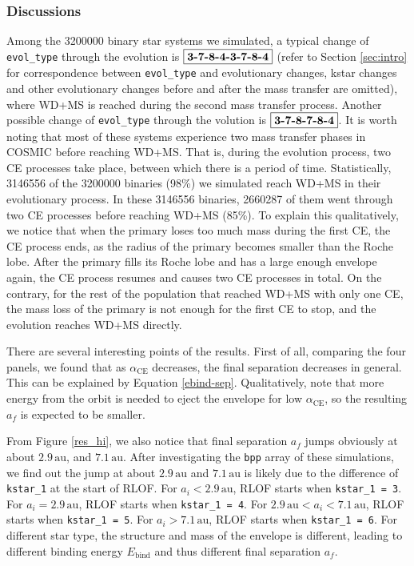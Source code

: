 \documentclass[12pt]{article}
\newcommand{\alphace}{\alpha_{\mathrm{CE}}}
\newcommand{\Ebind}{E_{\mathrm{bind}}}
\newcommand{\au}{\, \mathrm{au}}
\begin{document}
\subsubsection{Discussions}

Among the 3200000 binary star systems we simulated, a typical change of \verb|evol_type| through the evolution is $\boxed{\text{\textbf{3-7-8-4-3-7-8-4}}}$ (refer to Section \ref{sec:intro} for correspondence between \verb|evol_type| and evolutionary changes, kstar changes and other evolutionary changes before and after the mass transfer are omitted), where WD+MS is reached during the second mass transfer process. Another possible change of \verb|evol_type| through the volution is $\boxed{\text{\textbf{3-7-8-7-8-4}}}$. It is worth noting that most of these systems experience two mass transfer phases in COSMIC before reaching WD+MS. That is, during the evolution process, two CE processes take place, between which there is a period of time. Statistically, 3146556 of the 3200000 binaries (98\%) we simulated reach WD+MS in their evolutionary process. In these 3146556 binaries, 2660287 of them went through two CE processes before reaching WD+MS (85\%). To explain this qualitatively, we notice that when the primary loses too much mass during the first CE, the CE process ends, as the radius of the primary becomes smaller than the Roche lobe. After the primary fills its Roche lobe and has a large enough envelope again, the CE process resumes and causes two CE processes in total. On the contrary, for the rest of the population that reached WD+MS with only one CE, the mass loss of the primary is not enough for the first CE to stop, and the evolution reaches WD+MS directly.

There are several interesting points of the results. First of all, comparing the four panels, we found that as $\alphace$ decreases, the final separation decreases in general. This can be explained by Equation \ref{ebind-sep}. Qualitatively, note that more energy from the orbit is needed to eject the envelope for low $\alphace$, so the resulting $a_f$ is expected to be smaller. 

From Figure \ref{res_hi}, we also notice that final separation $a_f$ jumps obviously at about $2.9 \au$, and $7.1 \au$. After investigating the \verb|bpp| array of these simulations, we find out the jump at about $2.9 \au$ and $7.1 \au$ is likely due to the difference of \verb|kstar_1| at the start of RLOF. For $a_i < 2.9 \au$, RLOF starts when \verb|kstar_1 = 3|. For $a_i = 2.9 \au$, RLOF starts when \verb|kstar_1 = 4|. For $2.9 \au < a_i < 7.1 \au$, RLOF starts when \verb|kstar_1 = 5|. For $a_i > 7.1 \au$, RLOF starts when \verb|kstar_1 = 6|. For different star type, the structure and mass of the envelope is different, leading to different binding energy $\Ebind$ and thus different final separation $a_f$.
\end{document}
